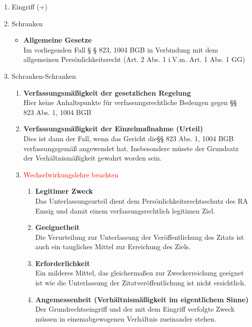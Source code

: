 \begin{enumerate}[label={\roman*)}]
\begin{itemize}
\begin{itemize}
        \end{itemize}
    \end{itemize}
    \item Eingriff (+)
    \item Schranken
    \begin{itemize}
        \item \textbf{Allgemeine Gesetze}\\
        Im vorliegenden Fall § § 823, 1004 BGB in Verbindung mit dem allgemeinen Persönlichkeitsrecht (Art. 2 Abs. 1 i.V.m. Art. 1 Abs. 1 GG) 
    \end{itemize}
    \item Schranken-Schranken
    \begin{enumerate}[label=\arabic*.]
        \item \textbf{Verfassungsmäßigkeit der gesetzlichen Regelung} \\
        Hier keine Anhaltspunkte für verfassungsrechtliche Bedengen gegen §§ 823 Abs. 1, 1004 BGB
        \item \textbf{Verfassungsmäßigkeit der Einzelmaßnahme (Urteil)}\\
        Dies ist dann der Fall, wenn das Gericht die§§ 823 Abs. 1, 1004 BGB verfassungsgemäß angewendet hat. Insbesondere müsste der Grundsatz der Verhältnismäßigkeit gewahrt worden sein.
        \item \textcolor{red}{Wechselwirkungslehre beachten}
        \begin{enumerate}[label={\alph*)}]
            \item \textbf{Legitimer Zweck}\\
            Das Unterlassungsurteil dient dem Persönlichkeitsrechtsschutz des RA Emsig und damit einem verfassungsrechtlich legitimen Ziel.
            \item \textbf{Geeignetheit}\\
            Die Verurteilung zur Unterlassung der Veröffentlichung des Zitats ist auch ein taugliches Mittel zur Erreichung des Ziels.
            \item \textbf{Erforderlichkeit}\\
            Ein milderes Mittel, das gleichermaßen zur Zweckerreichung geeignet ist wie die Unterlassung der Zitatveröffentlichung ist nicht ersichtlich.
            \item \textbf{Angemessenheit (Verhältnismäßigkeit im eigentlichem Sinne)}\\
            Der Grundrechtseingriff und der mit dem Eingriff verfolgte Zweck müssen in einemabgewogenen Verhältnis zueinander stehen.
        \end{enumerate}
    \end{enumerate}
\end{enumerate}
